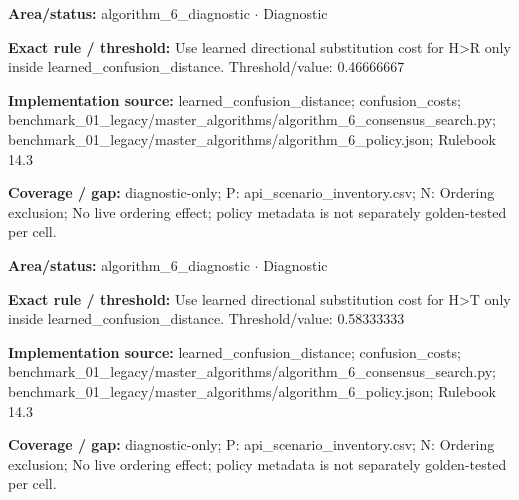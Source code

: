 \begin{tcolorbox}[enhanced,breakable,colback=white,colframe=Muted!45,boxrule=0.45pt,arc=1.5pt,left=6pt,right=6pt,top=5pt,bottom=5pt,title={\texttt{A6-LEARNED-SUBSTITUTION-H-R}},title after break={\texttt{A6-LEARNED-SUBSTITUTION-H-R}\ (continued)},fonttitle=\headingfont\bfseries\color{Navy},coltitle=Navy]
\textbf{Area/status:} algorithm\_\allowbreak{}6\_\allowbreak{}diagnostic $\boldsymbol{\cdot}$ Diagnostic\par
\smallskip
\textbf{Exact rule / threshold:} Use learned directional substitution cost for H>R only inside learned\_\allowbreak{}confusion\_\allowbreak{}distance. Threshold/\allowbreak{}value: 0.46666667\par
\smallskip
\textbf{Implementation source:} learned\_\allowbreak{}confusion\_\allowbreak{}distance; confusion\_\allowbreak{}costs; benchmark\_\allowbreak{}01\_\allowbreak{}legacy/\allowbreak{}master\_\allowbreak{}algorithms/\allowbreak{}algorithm\_\allowbreak{}6\_\allowbreak{}consensus\_\allowbreak{}search.py; benchmark\_\allowbreak{}01\_\allowbreak{}legacy/\allowbreak{}master\_\allowbreak{}algorithms/\allowbreak{}algorithm\_\allowbreak{}6\_\allowbreak{}policy.json; Rulebook 14.3\par
\smallskip
\textbf{Coverage / gap:} diagnostic-only; P: api\_\allowbreak{}scenario\_\allowbreak{}inventory.csv; N: Ordering exclusion; No live ordering effect; policy metadata is not separately golden-tested per cell.
\end{tcolorbox}
\begin{tcolorbox}[enhanced,breakable,colback=white,colframe=Muted!45,boxrule=0.45pt,arc=1.5pt,left=6pt,right=6pt,top=5pt,bottom=5pt,title={\texttt{A6-LEARNED-SUBSTITUTION-H-T}},title after break={\texttt{A6-LEARNED-SUBSTITUTION-H-T}\ (continued)},fonttitle=\headingfont\bfseries\color{Navy},coltitle=Navy]
\textbf{Area/status:} algorithm\_\allowbreak{}6\_\allowbreak{}diagnostic $\boldsymbol{\cdot}$ Diagnostic\par
\smallskip
\textbf{Exact rule / threshold:} Use learned directional substitution cost for H>T only inside learned\_\allowbreak{}confusion\_\allowbreak{}distance. Threshold/\allowbreak{}value: 0.58333333\par
\smallskip
\textbf{Implementation source:} learned\_\allowbreak{}confusion\_\allowbreak{}distance; confusion\_\allowbreak{}costs; benchmark\_\allowbreak{}01\_\allowbreak{}legacy/\allowbreak{}master\_\allowbreak{}algorithms/\allowbreak{}algorithm\_\allowbreak{}6\_\allowbreak{}consensus\_\allowbreak{}search.py; benchmark\_\allowbreak{}01\_\allowbreak{}legacy/\allowbreak{}master\_\allowbreak{}algorithms/\allowbreak{}algorithm\_\allowbreak{}6\_\allowbreak{}policy.json; Rulebook 14.3\par
\smallskip
\textbf{Coverage / gap:} diagnostic-only; P: api\_\allowbreak{}scenario\_\allowbreak{}inventory.csv; N: Ordering exclusion; No live ordering effect; policy metadata is not separately golden-tested per cell.
\end{tcolorbox}
